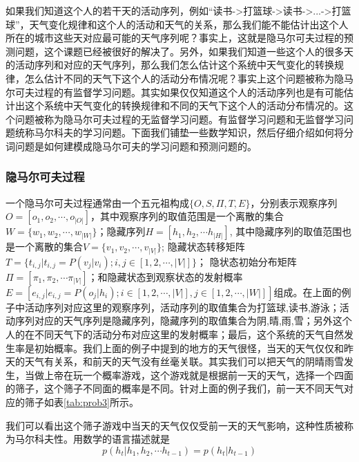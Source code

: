 \documentclass[twoside,a4paper,12pt]{book}%
\begin{document}
如果我们知道这个人的若干天的活动序列，例如“读书->打篮球->读书->...->打篮球”，天气变化规律和这个人的活动和天气的关系，那么我们能不能估计出这个人所在的城市这些天对应最可能的天气序列呢？事实上，这就是隐马尔可夫过程的预测问题，这个课题已经被很好的解决了。另外，如果我们知道一些这个人的很多天的活动序列和对应的天气序列，那么我们怎么估计这个系统中天气变化的转换规律，怎么估计不同的天气下这个人的活动分布情况呢？事实上这个问题被称为隐马尔可夫过程的有监督学习问题。其实如果仅仅知道这个人的活动序列也是有可能估计出这个系统中天气变化的转换规律和不同的天气下这个人的活动分布情况的。这个问题被称为隐马尔可夫过程的无监督学习问题。有监督学习问题和无监督学习问题统称马尔科夫的学习问题。下面我们铺垫一些数学知识，然后仔细介绍如何将分词问题是如何建模成隐马尔可夫的学习问题和预测问题的。


\subsubsection{隐马尔可夫过程}
一个隐马尔可夫过程通常由一个五元祖构成$\{O,S,\Pi,T,E\}$，分别表示观察序列$O=[o_1,o_2,\cdots,o_{|O|}]$，其中观察序列的取值范围是一个离散的集合$W=\{w_1, w_2,\cdots,w_{|W|}\}$；隐藏序列$H=[h_1,h_2, \cdots h_{|H|}]$, 其中隐藏序列的取值范围也是一个离散的集合$V=\{v_1,v_2,\cdots,v_{|V|}\}$; 隐藏状态转移矩阵$T=\{t_{i,j}|t_{i,j}=P(v_j|v_i); i,j \in [1,2,\cdots,|V|]\}$； 隐状态初始分布矩阵$\Pi=[\pi_1,\pi_2,\cdots \pi_{|V|}]$；和隐藏状态到观察状态的发射概率$E=[e_{i,j} | e_{i,j}=P(o_j|h_i);i\in[1,2,\cdots,|V|],j\in[1,2,\cdots,|W|]]$组成。在上面的例子中活动序列对应这里的观察序列，活动序列的取值集合为{打篮球,读书,游泳}；活动序列对应的天气序列是隐藏序列，隐藏序列的取值集合为{阴,晴,雨,雪}；另外这个人的在不同天气下的活动分布对应这里的发射概率；最后，这个系统的天气自然发生率是初始概率。我们上面的例子中提到的地方的天气很怪，当天的天气仅仅和昨天的天气有关系，和前天的天气没有丝毫关联。其实我们可以把天气的阴晴雨雪发生，当做上帝在玩一个概率游戏，这个游戏就是根据前一天的天气，选择一个四面的筛子，这个筛子不同面的概率是不同。针对上面的例子我们，前一天不同天气对应的筛子如表\ref{tab:prob3}所示。
\begin{table} [h]
    \caption{天气筛子游戏}
	\label{tab:prob3}
	\centering
\end{table}  
我们可以看出这个筛子游戏中当天的天气仅仅受前一天的天气影响，这种性质被称为马尔科夫性。用数学的语言描述就是
$$
p(h_t|h_1,h_2, \cdots h_{t-1}) = p(h_t|h_{t-1})
$$
\end{document}
